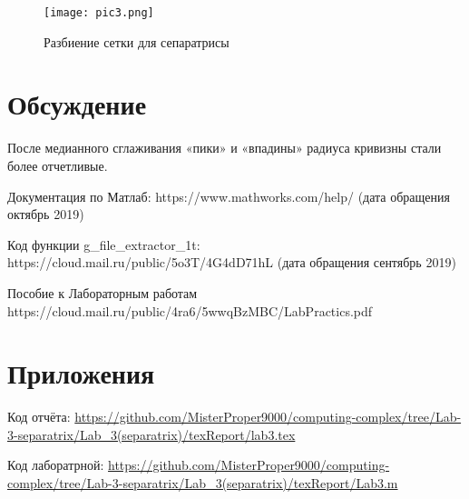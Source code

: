 \documentclass[a4]{article}
\begin{document}
\begin{figure}[H]
\begin{center}
\caption{Разбиение сетки для сепаратрисы}
\texttt{[image: pic3.png]} 
\end{center}
\end{figure}



\section{Обсуждение}
После медианного сглаживания «пики» и «впадины» радиуса кривизны стали более отчетливые.

\begin{thebibliography}{}
      Документация по Матлаб: https://www.mathworks.com/help/ (дата обращения октябрь 2019)

     Код функции g\_file\_extractor\_1t: https://cloud.mail.ru/public/5o3T/4G4dD71hL (дата обращения сентябрь 2019)
    
    Пособие к Лабораторным работам https://cloud.mail.ru/public/4ra6/5wwqBzMBC/LabPractics.pdf
\end{thebibliography}

\section{Приложения}

Код отчёта:\; \url{https://github.com/MisterProper9000/computing-complex/tree/Lab-3-separatrix/Lab_3(separatrix)/texReport/lab3.tex}

Код лаборатрной:\; \url{https://github.com/MisterProper9000/computing-complex/tree/Lab-3-separatrix/Lab_3(separatrix)/texReport/Lab3.m}


\end{document}
